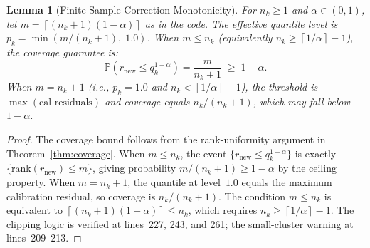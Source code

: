 \documentclass[11pt]{article}
\newtheorem{lemma}[theorem]{Lemma}
\newcommand{\Pbb}{\mathbb{P}}
\newcommand{\ceil}[1]{\left\lceil #1 \right\rceil}
\begin{document}
\begin{lemma}[Finite-Sample Correction Monotonicity]\label{lem:correction}
For $n_k \geq 1$ and $\alpha \in (0,1)$, let $m = \ceil{(n_k+1)(1-\alpha)}$ as in the code. The effective quantile level is $p_k = \min(m/(n_k+1),\; 1.0)$. When $m \leq n_k$ (equivalently $n_k \geq \ceil{1/\alpha} - 1$), the coverage guarantee is:
\[
\Pbb(r_{\text{new}} \leq q_k^{1-\alpha}) = \frac{m}{n_k + 1} \;\geq\; 1 - \alpha.
\]
When $m = n_k + 1$ (i.e., $p_k = 1.0$ and $n_k < \ceil{1/\alpha} - 1$), the threshold is $\max(\text{cal residuals})$ and coverage equals $n_k/(n_k+1)$, which may fall below $1-\alpha$.
\end{lemma}
\begin{proof}
The coverage bound follows from the rank-uniformity argument in Theorem~\ref{thm:coverage}. When $m \leq n_k$, the event $\{r_{\text{new}} \leq q_k^{1-\alpha}\}$ is exactly $\{\text{rank}(r_{\text{new}}) \leq m\}$, giving probability $m/(n_k+1) \geq 1-\alpha$ by the ceiling property. When $m = n_k+1$, the quantile at level~$1.0$ equals the maximum calibration residual, so coverage is $n_k/(n_k+1)$. The condition $m \leq n_k$ is equivalent to $\ceil{(n_k+1)(1-\alpha)} \leq n_k$, which requires $n_k \geq \ceil{1/\alpha} - 1$. The clipping logic is verified at lines~227, 243, and 261; the small-cluster warning at lines~209--213.
\end{proof}

\end{document}
